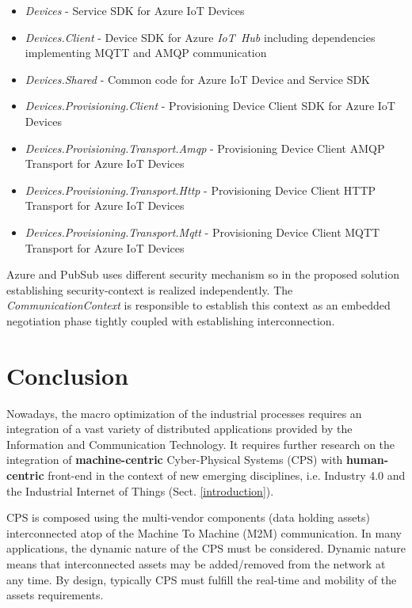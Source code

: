 \documentclass{article}
\begin{document}
\begin{itemize}
      \item \textit{Devices} - Service SDK for Azure IoT Devices
      \item \textit{Devices.Client} - Device SDK for Azure \textit{IoT\ Hub} including dependencies implementing MQTT and AMQP communication
      \item \textit{Devices.Shared} - Common code for Azure IoT Device and Service SDK
      \item \textit{Devices.Provisioning.Client} - Provisioning Device Client SDK for Azure IoT Devices
      \item \textit{Devices.Provisioning.Transport.Amqp} - Provisioning Device Client AMQP Transport for Azure IoT Devices
      \item \textit{Devices.Provisioning.Transport.Http} - Provisioning Device Client HTTP Transport for Azure IoT Devices
      \item \textit{Devices.Provisioning.Transport.Mqtt} - Provisioning Device Client MQTT Transport for Azure IoT Devices
\end{itemize}

Azure and PubSub uses different security mechanism so in the proposed solution establishing security-context is realized independently. The \textit{CommunicationContext} is responsible to establish this context as an embedded negotiation phase tightly coupled with establishing interconnection.

\section{Conclusion}\label{section.conclusion}

Nowadays, the macro optimization of the industrial processes requires an integration of a vast variety of distributed applications provided by the Information and Communication Technology. It requires further research on the integration of \textbf{machine-centric} Cyber-Physical Systems (CPS) with \textbf{human-centric} front-end in the context of new emerging disciplines, i.e. Industry 4.0 and the Industrial Internet of Things (Sect. \ref*{introduction}).

CPS is composed using the multi-vendor components (data holding assets) interconnected atop of the Machine To Machine (M2M) communication. In many applications, the dynamic nature of the CPS must be considered. Dynamic nature means that interconnected assets may be added/removed from the network at any time. By design, typically CPS must fulfill the real-time and mobility of the assets requirements.
\end{document}
